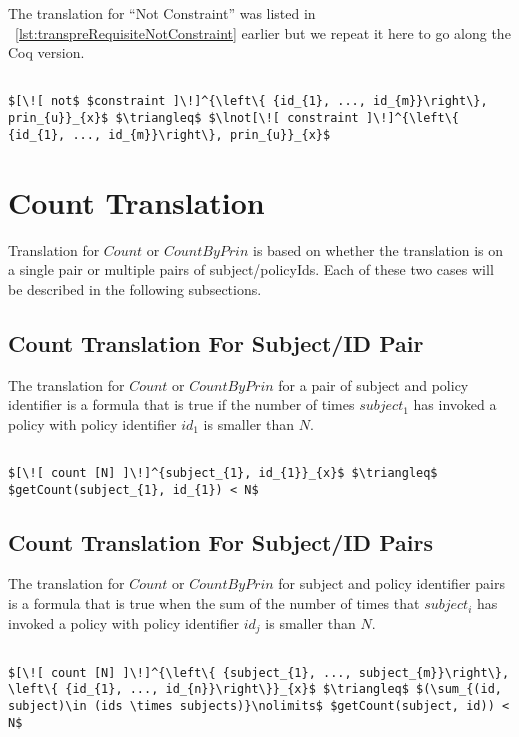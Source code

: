 The translation for ``Not Constraint'' was listed in ~\ref{lst:transpreRequisiteNotConstraint} earlier but we repeat it here to go along the Coq version. 

\lstset{mathescape, language=AST}  
\begin{lstlisting}[frame=single, caption={Not Constraint Translation},label={lst:transnotCons}]

$[\![ not$ $constraint ]\!]^{\left\{ {id_{1}, ..., id_{m}}\right\}, prin_{u}}_{x}$ $\triangleq$ $\lnot[\![ constraint ]\!]^{\left\{ {id_{1}, ..., id_{m}}\right\}, prin_{u}}_{x}$ 

\end{lstlisting}

\section{Count Translation}
Translation for $Count$ or $CountByPrin$ is based on whether the translation is on a single pair or multiple pairs of subject/policyIds. Each of these two cases will be described in the following subsections.

\subsection{Count Translation For Subject/ID Pair}
The translation for $Count$ or $CountByPrin$ for a pair of subject and policy identifier is a formula that is true if the number of times $subject_{1}$ has invoked a policy with policy identifier $id_{1}$ is smaller than $N$.

\lstset{mathescape, language=AST}  
\begin{lstlisting}[frame=single, caption={Count Translation {$\colon$} subject and policyId Pair},label={lst:transcountSinglePair}]

$[\![ count [N] ]\!]^{subject_{1}, id_{1}}_{x}$ $\triangleq$ $getCount(subject_{1}, id_{1}) < N$
\end{lstlisting}

\subsection{Count Translation For Subject/ID Pairs}
The translation for $Count$ or $CountByPrin$ for subject and policy identifier pairs is a formula that is true when the sum of the number of times that $subject_{i}$ has invoked a policy with policy identifier $id_{j}$ is smaller than $N$.

\lstset{mathescape, language=AST}  
\begin{lstlisting}[frame=single, caption={Count Translation {$\colon$} subject and policyId Pairs},label={lst:transcountSinglePairs}]

$[\![ count [N] ]\!]^{\left\{ {subject_{1}, ..., subject_{m}}\right\}, \left\{ {id_{1}, ..., id_{n}}\right\}}_{x}$ $\triangleq$ $(\sum_{(id, subject)\in (ids \times subjects)}\nolimits$ $getCount(subject, id)) < N$

\end{lstlisting}





